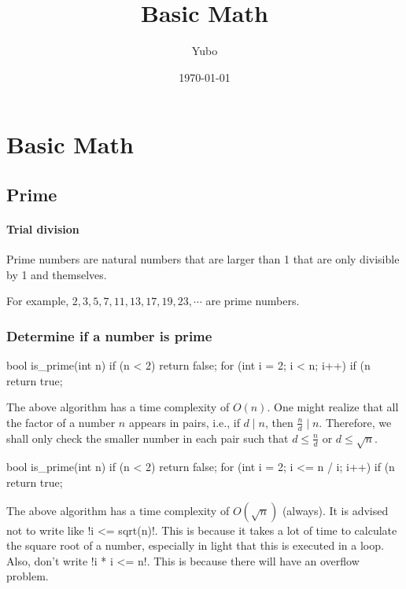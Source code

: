 \documentclass{article}
\title{Basic Math}
\author{Yubo \icon{yubo}}
\date{\today}
\begin{document}
\maketitle

\section{Basic Math}

\subsection{Prime}

\paragraph{Trial division}

Prime numbers are natural numbers that are larger than 1 that are only divisible by 1 and themselves.

For example, $2, 3, 5, 7, 11, 13, 17, 19, 23, \cdots$ are prime numbers.

\subsubsection{Determine if a number is prime}

\begin{monos}
bool is_prime(int n) {
    if (n < 2) return false;
    for (int i = 2; i < n; i++)
        if (n %
    return true;
}
\end{monos}

The above algorithm has a time complexity of $O(n)$. One might realize that all the factor of a number $n$ appears in pairs, i.e., if $d \mid n$, then $\frac{n}{d} \mid n$. Therefore, we shall only check the smaller number in each pair such that $d \le \frac{n}{d}$ or $d \le \sqrt{n}$.

\begin{monos}
bool is_prime(int n) {
    if (n < 2) return false;
    for (int i = 2; i <= n / i; i++)
        if (n %
    return true;
}
\end{monos}

The above algorithm has a time complexity of $O(\sqrt{n})$ (always). It is advised not to write like \mono!i <= sqrt(n)!. This is because it takes a lot of time to calculate the square root of a number, especially in light that this is executed in a loop. Also, don't write \mono!i * i <= n!. This is because there will have an overflow problem.
\end{document}
